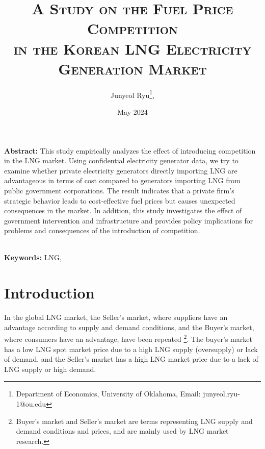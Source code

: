 \documentclass[12pt]{article}
\begin{document}
\setcounter{page}{0}




\title{\Large{\textsc{{\textbf{A Study on the Fuel Price Competition
}}\\
\large{in the Korean LNG Electricity Generation Market}}}}

\author{Junyeol Ryu\footnote{Department of Economics, University of Oklahoma, Email: junyeol.ryu-1@ou.edu}, }

\setlength{\parskip}{1.5\baselineskip}

\date{May 2024}
\maketitle
\doublespacing
\setlength{\parskip}{0pt}

\singlespacing
\textbf{Abstract:} 
This study empirically analyzes the effect of introducing competition in the LNG market. Using confidential electricity generator data, we try to examine whether private electricity generators directly importing LNG are advantageous in terms of cost compared to generators importing LNG from public government corporations. The result indicates that a private firm's strategic behavior leads to cost-effective fuel prices but causes unexpected consequences in the market. In addition, this study investigates the effect of government intervention and infrastructure and provides policy implications for problems and consequences of the introduction of competition. 

\\

\noindent \textbf{Keywords:} LNG, 
\\





\newpage
\doublespacing

\section{Introduction}

In the global LNG market, the Seller's market, where suppliers have an advantage according to supply and demand conditions, and the Buyer's market, where consumers have an advantage, have been repeated \footnote{Buyer's market and Seller's market are terms representing LNG supply and demand conditions and prices, and are mainly used by LNG market research.}. The buyer's market has a low LNG spot market price due to a high LNG supply (oversupply) or lack of demand, and the Seller's market has a high LNG market price due to a lack of LNG supply or high demand. 
\end{document}
